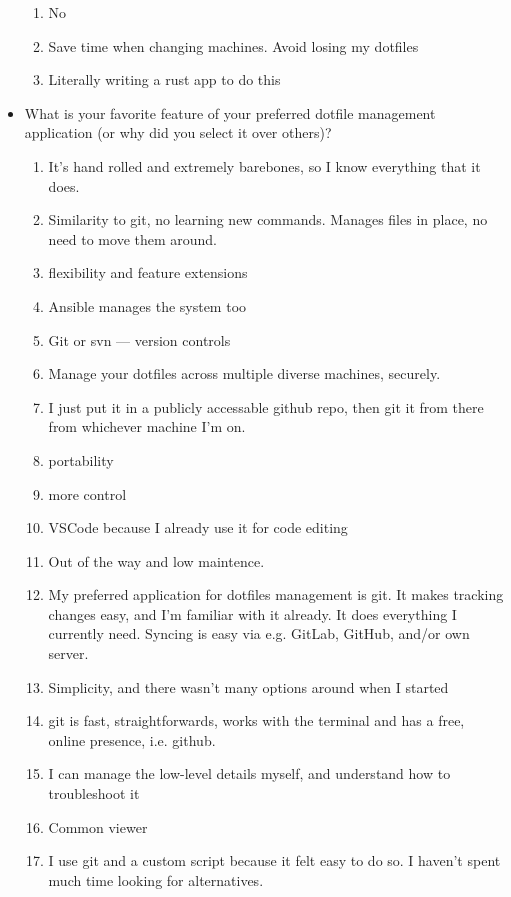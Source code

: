 \documentclass[letterpaper]{jdf}
\begin{document}
\begin{itemize}
\begin{enumerate}
        \item No
        \item Save time when changing machines. Avoid losing my dotfiles
        \item Literally writing a rust app to do this
    \end{enumerate}
    \item What is your favorite feature of your preferred dotfile management application (or why did you select it over others)?
    \begin{enumerate}
        \item It's hand rolled and extremely barebones, so I know everything that it does.
        \item Similarity to git, no learning new commands. Manages files in place, no need to move them around.
        \item flexibility and feature extensions
        \item Ansible manages the system too
        \item Git or svn — version controls
        \item Manage your dotfiles across multiple diverse machines, securely.
        \item I just put it in a publicly accessable github repo, then git it from there from whichever machine I'm on.
        \item portability
        \item more control
        \item VSCode because I already use it for code editing
        \item Out of the way and low maintence.
        \item My preferred application for dotfiles management is git. It makes tracking changes easy, and I'm familiar with it already. It does everything I currently need. Syncing is easy via e.g. GitLab, GitHub, and/or own server.
        \item Simplicity, and there wasn't many options around when I started
        \item git is fast, straightforwards, works with the terminal and has a free, online presence, i.e. github.
        \item I can manage the low-level details myself, and understand how to troubleshoot it
        \item Common viewer
        \item I use git and a custom script because it felt easy to do so. I haven't spent much time looking for alternatives.

\end{enumerate}
\end{itemize}
\end{document}
